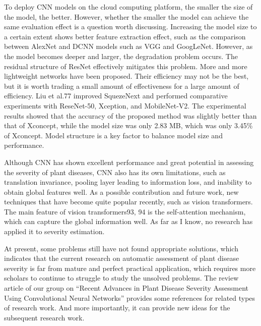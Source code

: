 To deploy CNN models on the cloud computing platform, the smaller the size of the model, the better. However, whether the smaller the model can achieve the same evaluation effect is a question worth discussing. Increasing the model size to a certain extent shows better feature extraction effect, such as the comparison between AlexNet and DCNN models such as VGG and GoogLeNet. However, as the model becomes deeper and larger, the degradation problem occurs. The residual structure of ResNet effectively mitigates this problem. More and more lightweight networks have been proposed. Their efficiency may not be the best, but it is worth trading a small amount of effectiveness for a large amount of efficiency. Liu et al.77 improved SquezeNext and performed comparative experiments with ReseNet-50, Xception, and MobileNet-V2. The experimental results showed that the accuracy of the proposed method was slightly better than that of Xconcept, while the model size was only 2.83 MB, which was only 3.45\% of Xconcept. Model structure is a key factor to balance model size and performance.

Although CNN has shown excellent performance and great potential in assessing the severity of plant diseases, CNN also has its own limitations, such as translation invariance, pooling layer leading to information loss, and inability to obtain global features well. As a possible contribution and future work, new techniques that have become quite popular recently, such as vision transformers. The main feature of vision transformers93, 94 is the self-attention mechanism, which can capture the global information well. As far as I know, no research has applied it to severity estimation.

At present, some problems still have not found appropriate solutions, which indicates that the current research on automatic assessment of plant disease severity is far from mature and perfect practical application, which requires more scholars to continue to struggle to study the unsolved problems. The review article of our group on “Recent Advances in Plant Disease Severity Assessment Using Convolutional Neural Networks” provides some references for related types of research work. And more importantly, it can provide new ideas for the subsequent research work.



